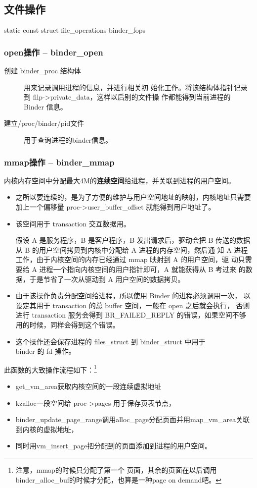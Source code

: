 \documentclass[a4paper,11pt]{article}
\begin{document}
\subsection{文件操作}
static const struct file_operations binder_fops

\subsubsection{open操作 -- binder_open}  
\begin{description}
    \item[创建 binder_proc 结构体]用来记录调用进程的信息，并进行相关初
        始化工作。将该结构体指针记录到 filp->private_data，这样以后别的文件操
        作都能得到当前进程的 Binder 信息。
    \item[建立/proc/binder/pid文件] 用于查询进程的binder信息。
\end{description}

\subsubsection{mmap操作 -- binder_mmap}
内核内存空间中分配最大4M的\textbf{\color{red}连续空间}给进程，并关联到进程的用户空间。
\begin{itemize}
    \item 之所以要连续的，是为了方便的维护与用户空间地址的映射，内核地址只需要
        加上一个偏移量 proc->user_buffer_offset 就能得到用户地址了。
    \item 该空间用于 transaction 交互数据用。

        {\footnotesize 假设 A 是服务程序，B 是客户程序，B 发出请求后，驱动会把
        B 传送的数据从 B 的用户空间拷贝到内核中分配给 A 进程的内存空间，然后通
        知 A 进程工作，由于内核空间的内存已经通过 mmap 映射到 A 的用户空间，驱
        动只需要给 A 进程一个指向内核空间的用户指针即可，A 就能获得从 B 考过来
        的数据，于是节省了一次从驱动到 A 用户空间的数据拷贝。}
    \item 由于该操作负责分配空间给进程，所以使用 Binder 的进程必须调用一次，
        以设定其用于 transaction 的总 buffer 空间，一般在 open 之后就会执行，
        否则进行 transaction 服务会得到 BR_FAILED_REPLY 的错误，如果空间不够
        用的时候，同样会得到这个错误。
    \item 这个操作还会保存进程的 files_struct 到 binder_struct 中用于\\ binder
        的 fd 操作。
\end{itemize}
此函数的大致操作流程如下：\footnote{\color{blue}注意，mmap的时候只分配了第一个
页面，其余的页面在以后调用binder_alloc_buf的时候才分配，也算是一种page on
demand吧。}
\begin{itemize}
    \item get_vm_area获取内核空间的一段连续虚拟地址
    \item kzalloc一段空间给 proc->pages 用于保存页表节点，
    \item binder_update_page_range调用alloc_page分配页面并用map_vm_area关联到内核的虚拟地址，
    \item 同时用vm_insert_page把分配到的页面添加到进程的用户空间。
\end{itemize}
\end{document}
